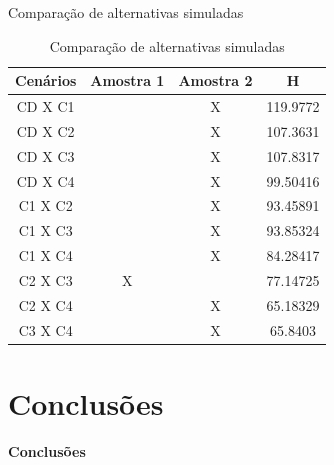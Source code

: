 \documentclass[xcolor=dvipsnames]{beamer}
\begin{document}
\begin{frame}{Comparação de alternativas simuladas}
	\begin{table}[H]
		\centering
		\begin{tabular}{|c|c|c|c|}
			\hline
			\textbf{Cenários} & \textbf{Amostra 1} & \textbf{Amostra 2} & \textbf{H} \\ \hline
			CD X C1            & ~                  & X                  & 119.9772  \\ \hline
			CD X C2            & ~                  & X                  & 107.3631   \\ \hline
			CD X C3            & ~                  & X                  & 107.8317    \\ \hline
			CD X C4            & ~                  & X                  & 99.50416    \\ \hline
			C1 X C2            & ~                  & X                  & 93.45891     \\ \hline
			C1 X C3            & ~                  & X                  & 93.85324     \\ \hline
			C1 X C4            & ~                  & X                  & 84.28417     \\ \hline
			C2 X C3            & X                  & ~                  & 77.14725    \\ \hline
			C2 X C4            & ~                  & X                  & 65.18329      \\ \hline
			C3 X C4            & ~                  & X                  & 65.8403      \\ \hline
		\end{tabular}
		\caption {Comparação de alternativas simuladas}
	\end{table}
\end{frame}
	
\section{Conclusões}

\begin{frame}{}
	\centering
	\Huge \color{blue} \textbf{Conclusões}
\end{frame}
	
\end{document}

